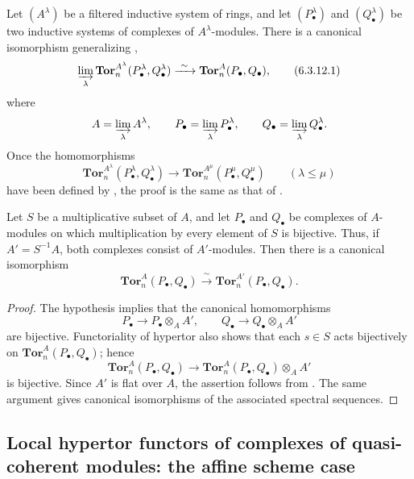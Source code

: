 \begin{remark}[6.3.12]
\label{III.6.3.12}
Let $(A^\lambda)$ be a filtered inductive system of rings, and let
$(P_\bullet^\lambda)$ and $(Q_\bullet^\lambda)$ be two inductive
systems of complexes of $A^\lambda$-modules.  There is a canonical
isomorphism generalizing ,
\[
  \varinjlim_\lambda
  \mathbf{Tor}_n^{A^\lambda}
  (P_\bullet^\lambda,Q_\bullet^\lambda)
  \xrightarrow{\ \sim\ }
  \mathbf{Tor}_n^A(P_\bullet,Q_\bullet),
  \tag{6.3.12.1}\label{III.6.3.12.1}
\]
where
\[
  A=\varinjlim_\lambda A^\lambda,
  \qquad
  P_\bullet=\varinjlim_\lambda P_\bullet^\lambda,
  \qquad
  Q_\bullet=\varinjlim_\lambda Q_\bullet^\lambda.
\]
Once the homomorphisms
\[
  \mathbf{Tor}_n^{A^\lambda}
  (P_\bullet^\lambda,Q_\bullet^\lambda)
  \longrightarrow
  \mathbf{Tor}_n^{A^\mu}
  (P_\bullet^\mu,Q_\bullet^\mu)
  \qquad(\lambda\leq\mu)
\]
have been defined by , the proof is the same as
that of .
\end{remark}

\begin{proposition}[6.3.13]
\label{III.6.3.13}
Let $S$ be a multiplicative subset of $A$, and let $P_\bullet$ and
$Q_\bullet$ be complexes of $A$-modules on which multiplication by
every element of $S$ is bijective.  Thus, if $A'=S^{-1}A$, both
complexes consist of $A'$-modules.  Then there is a canonical
isomorphism
\[
  \mathbf{Tor}_n^A(P_\bullet,Q_\bullet)
  \xrightarrow{\ \sim\ }
  \mathbf{Tor}_n^{A'}(P_\bullet,Q_\bullet).
\]
\end{proposition}

\begin{proof}
The hypothesis implies that the canonical homomorphisms
\[
  P_\bullet\longrightarrow P_\bullet\otimes_AA',
  \qquad
  Q_\bullet\longrightarrow Q_\bullet\otimes_AA'
\]
are bijective.  Functoriality of hypertor also shows that each
$s\in S$ acts bijectively on
$\mathbf{Tor}_n^A(P_\bullet,Q_\bullet)$; hence
\[
  \mathbf{Tor}_n^A(P_\bullet,Q_\bullet)
  \longrightarrow
  \mathbf{Tor}_n^A(P_\bullet,Q_\bullet)\otimes_AA'
\]
is bijective.  Since $A'$ is flat over $A$, the assertion follows
from .  The same argument gives canonical
isomorphisms of the associated spectral sequences.
\end{proof}


\subsection{Local hypertor functors of complexes of quasi-coherent modules: the affine scheme case}
\label{subsection:III.6.4}
\label{III.6.4}

